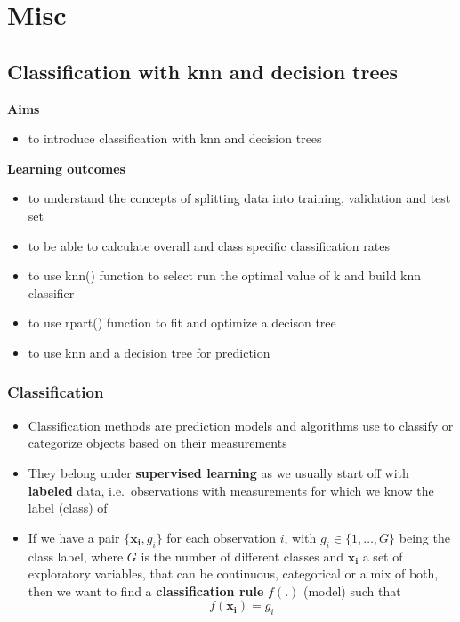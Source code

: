 \documentclass[
]{book}
\providecommand{\tightlist}{%
  \setlength{\itemsep}{0pt}\setlength{\parskip}{0pt}}
\theoremstyle{definition}
\theoremstyle{definition}
\theoremstyle{definition}
\theoremstyle{remark}
\begin{document}
\hypertarget{part-misc}{%
\part{Misc}\label{part-misc}}

\hypertarget{classification-with-knn-and-decision-trees}{%
\chapter{Classification with knn and decision trees}\label{classification-with-knn-and-decision-trees}}

\textbf{Aims}

\begin{itemize}
\tightlist
\item
  to introduce classification with knn and decision trees
\end{itemize}

\textbf{Learning outcomes}

\begin{itemize}
\tightlist
\item
  to understand the concepts of splitting data into training, validation and test set
\item
  to be able to calculate overall and class specific classification rates
\item
  to use knn() function to select run the optimal value of k and build knn classifier
\item
  to use rpart() function to fit and optimize a decison tree
\item
  to use knn and a decision tree for prediction
\end{itemize}

\hypertarget{classification}{%
\section{Classification}\label{classification}}

\begin{itemize}
\tightlist
\item
  Classification methods are prediction models and algorithms use to classify or categorize objects based on their measurements
\item
  They belong under \textbf{supervised learning} as we usually start off with \textbf{labeled} data, i.e.~observations with measurements for which we know the label (class) of
\item
  If we have a pair \(\{\mathbf{x_i}, g_i\}\) for each observation \(i\), with \(g_i \in \{1, \dots, G\}\) being the class label, where \(G\) is the number of different classes and \(\mathbf{x_i}\) a set of exploratory variables, that can be continuous, categorical or a mix of both, then we want to find a \textbf{classification rule} \(f(.)\) (model) such that \[f(\mathbf{x_i})=g_i\]
\end{itemize}
\end{document}
